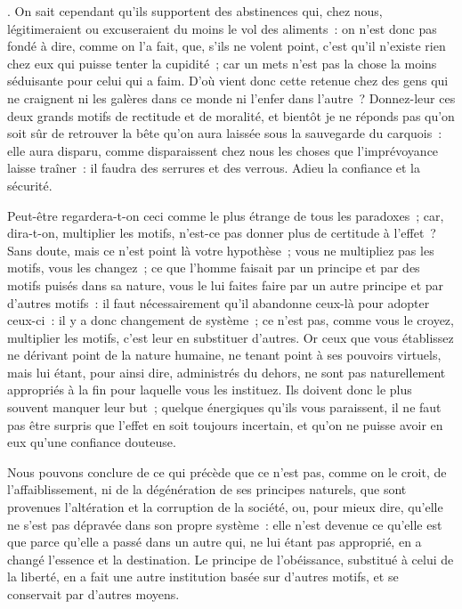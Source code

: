 \documentclass[french,twoside]{book} %
\begin{document}
{}. On sait cependant qu’ils supportent des abstinences qui, chez nous, légitimeraient ou excuseraient du moins le vol des aliments : on n’est donc pas fondé à dire, comme on l’a fait, que, s’ils ne volent point, c’est qu’il n’existe rien chez eux qui puisse tenter la cupidité ; car un mets n’est pas la chose la moins séduisante pour celui qui a faim. D’où vient donc cette retenue chez des gens qui ne craignent ni les galères dans ce monde ni l’enfer dans l’autre ? Donnez-leur ces deux grands motifs de rectitude et de moralité, et bientôt je ne réponds pas qu’on soit sûr de retrouver la bête qu’on aura laissée sous la sauvegarde du carquois : elle aura disparu, comme disparaissent chez nous les choses que l’imprévoyance laisse traîner : il faudra des serrures et des verrous. Adieu la confiance et la sécurité.\par
Peut-être regardera-t-on ceci comme le plus étrange de tous les paradoxes ; car, dira-t-on, multiplier les motifs, n’est-ce pas donner plus de certitude à l’effet ? Sans doute, mais ce n’est point là votre hypothèse ; vous ne multipliez pas les motifs, vous les changez ; ce que l’homme faisait par un principe et par des motifs puisés dans sa nature, vous le lui faites faire par un autre principe et par d’autres motifs : il faut nécessairement qu’il abandonne ceux-là pour adopter ceux-ci : il y a donc changement de système ; ce n’est pas, comme vous le croyez, multiplier les motifs, c’est leur en substituer d’autres. Or ceux que vous établissez ne dérivant point de la nature humaine, ne tenant point à ses pouvoirs virtuels, mais lui étant, pour ainsi dire, administrés du dehors, ne sont pas naturellement appropriés à la fin pour laquelle vous les instituez. Ils doivent donc le plus souvent manquer leur but ; quelque énergiques qu’ils vous paraissent, il ne faut pas être surpris que l’effet en soit toujours incertain, et qu’on ne puisse avoir en eux qu’une confiance douteuse.\par
Nous pouvons conclure de ce qui précède que ce n’est pas, comme on le croit, de l’affaiblissement, ni de la dégénération de ses principes naturels, que sont provenues l’altération et la corruption de la société, ou, pour mieux dire, qu’elle ne s’est pas dépravée dans son propre système : elle n’est devenue ce qu’elle est que parce qu’elle a passé dans un autre qui, ne lui étant pas approprié, en a changé l’essence et la destination. Le principe de l’obéissance, substitué à celui de la liberté, en a fait une autre institution basée sur d’autres motifs, et se conservait par d’autres moyens.\par
\end{document}
